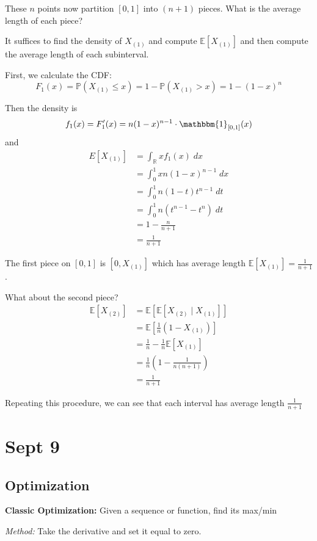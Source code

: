 \documentclass[12pt]{article}
\renewcommand{\P}{\mathbb{P}}
\newcommand{\R}{\mathbb{R}}
\newcommand{\E}{\mathbb{E}}
\newcommand{\ind}{\mathbbm{1}}
\begin{document}
    These $n$ points now partition $[0, 1]$ into $(n+1)$ pieces. What is the average length of each piece? 

    It suffices to find the density of $X_{(1)}$ and compute $\E[X_{(1)}]$ and then compute the average length of each subinterval.

    First, we calculate the CDF:
    \[F_1(x) = \P(X_{(1)} \leq x) = 1 - \P(X_{(1)} > x) = 1 - (1 - x)^n\] 

    Then the density is
    \[f_1(x) = F_1'(x) = n(1-x)^{n-1} \cdot \ind_{[0, 1]}(x)\] 
    and 
    \begin{align*}
        E[X_{(1)}] &= \int_{\R} x f_1(x) \; dx\\ 
            &= \int_0^1 x n(1-x)^{n-1} \; dx\\
            &= \int_0^1 n(1 - t)t^{n-1}\; dt\\ 
            &= \int_0^1 n(t^{n-1} - t^n)\; dt\\ 
            &= 1 - \frac{n}{n+1}\\ 
            &= \frac{1}{n+1}
    \end{align*}

    The first piece on $[0, 1]$ is $[0, X_{(1)}]$ which has average length $\E[X_{(1)}] = \frac{1}{n + 1}$. 

    What about the second piece? 
    \begin{align*}
        \E[X_{(2)}] &= \E[\E[X_{(2)} \; | \; X_{(1)}]] \\ 
        &= \E[\frac{1}{n}(1 - X_{(1)})]\\ 
        &= \frac{1}{n} - \frac{1}{n}\E[X_{(1)}]\\
        &= \frac{1}{n}\left(1 - \frac{1}{n(n+1)}\right)\\
        &= \frac{1}{n+1}
    \end{align*}

    Repeating this procedure, we can see that each interval has average length $\frac{1}{n+1}$

\section{Sept 9}
\subsection*{Optimization}
        \textbf{Classic Optimization:} Given a sequence or function, find its max/min 

        \emph{Method:} Take the derivative and set it equal to zero.
\end{document}
